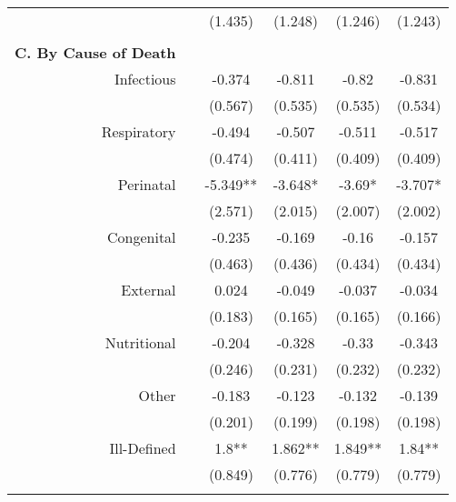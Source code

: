 \begin{table}[h!]
\begin{footnotesize}
\begin{center}
{\begin{threeparttable}[b]
\begin{tabular}{rrcccc}
          &       & (1.435) & (1.248) & (1.246) & (1.243) \\
          &       &       &       &       &  \\
    \midrule
    \multicolumn{1}{p{15.145em}}{\textbf{C. By Cause of Death}} &       &       &       &       &  \\
    \multicolumn{1}{p{15.145em}}{Infectious} &       & -0.374 & -0.811 & -0.82 & -0.831 \\
          &       & (0.567) & (0.535) & (0.535) & (0.534) \\
    \multicolumn{1}{p{15.145em}}{Respiratory} &       & -0.494 & -0.507 & -0.511 & -0.517 \\
          &       & (0.474) & (0.411) & (0.409) & (0.409) \\
    \multicolumn{1}{p{15.145em}}{Perinatal} &       & -5.349** & -3.648* & -3.69* & -3.707* \\
          &       & (2.571) & (2.015) & (2.007) & (2.002) \\
    \multicolumn{1}{p{15.145em}}{Congenital} &       & -0.235 & -0.169 & -0.16 & -0.157 \\
          &       & (0.463) & (0.436) & (0.434) & (0.434) \\
    \multicolumn{1}{p{15.145em}}{External} &       & 0.024 & -0.049 & -0.037 & -0.034 \\
          &       & (0.183) & (0.165) & (0.165) & (0.166) \\
    \multicolumn{1}{p{15.145em}}{Nutritional} &       & -0.204 & -0.328 & -0.33 & -0.343 \\
          &       & (0.246) & (0.231) & (0.232) & (0.232) \\
    \multicolumn{1}{p{15.145em}}{Other} &       & -0.183 & -0.123 & -0.132 & -0.139 \\
          &       & (0.201) & (0.199) & (0.198) & (0.198) \\
    \multicolumn{1}{p{15.145em}}{Ill-Defined} &       & 1.8** & 1.862** & 1.849** & 1.84** \\
          &       & (0.849) & (0.776) & (0.779) & (0.779) \\
          &       &       &       &       &  \\
    \bottomrule
    \bottomrule
    \end{tabular}%
    

\end{threeparttable}}
\end{center}
\end{footnotesize}
\end{table}
